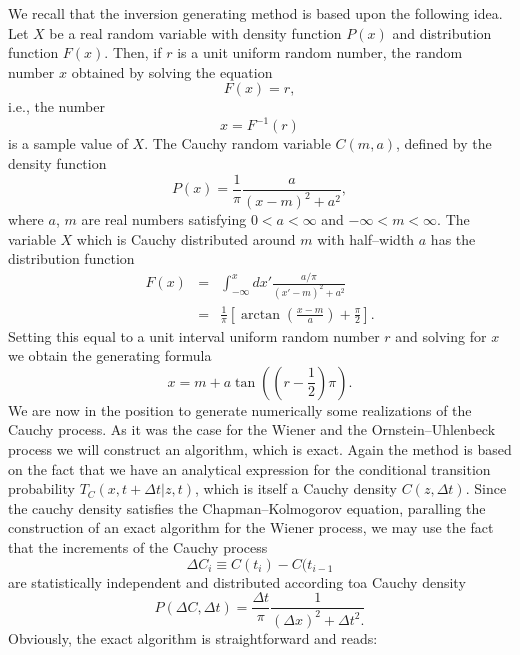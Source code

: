 We recall that the inversion generating method is based upon the following
idea. Let $X$ be a real random variable with density function $P(x)$
and distribution function $F(x)$. Then, if $r$ is a unit uniform random
number, the random number $x$ obtained by solving the equation
\begin{displaymath}
  F(x) = r,
\end{displaymath}
i.e., the number
\begin{displaymath}
  x = F^{-1}(r)
\end{displaymath}
is a sample value of $X$. The Cauchy random variable $C(m,a)$, defined by the
density function
\begin{displaymath}
  P(x) = \frac{1}{\pi} \frac{a}{(x-m)^2 + a^2},
\end{displaymath}
where $a$, $m$ are real numbers satisfying $0 < a< \infty$ and 
$-\infty < m < \infty$. The variable $X$ which is
Cauchy distributed around $m$ with half--width $a$ has the distribution
function
\begin{eqnarray*}
  F(x) &=& \int_{- \infty}^x dx' \frac{a/\pi}{(x' - m)^2+ a^2}  \\
       & = & \frac{1}{\pi} 
    \left[ \arctan \left( \frac{x-m}{a}\right) 
              + \frac{\pi}{2} \right].
\end{eqnarray*}
Setting this equal to a unit interval uniform random number $r$ and solving
for $x$ we obtain the generating formula
\begin{displaymath}
  x = m + a \tan\left( (r -\frac{1}{2}) \pi \right).
\end{displaymath}
We are now in the position to generate numerically some realizations of the
Cauchy process. As it was the case for the Wiener and the Ornstein--Uhlenbeck
process we will construct an algorithm, which is exact. Again the method is
based on the fact that we have an analytical expression for the conditional
transition probability $T_C(x,t+\Delta t| z,t)$, which is itself a Cauchy
density $C(z,\Delta t)$. Since the cauchy density satisfies the
Chapman--Kolmogorov equation, paralling the construction of an exact algorithm
for the Wiener process, we may use the fact that the increments of the Cauchy
process
\begin{displaymath}
  \Delta C_i \equiv C(t_i) -  C(t_{i-1}
\end{displaymath}
are statistically independent and distributed according toa Cauchy density
\begin{displaymath}
  P(\Delta C, \Delta t) = \frac{\Delta t}{\pi }
                          \frac{1}{(\Delta x)^2  + \Delta t^2.}
\end{displaymath}
Obviously, the exact algorithm is straightforward and reads:

